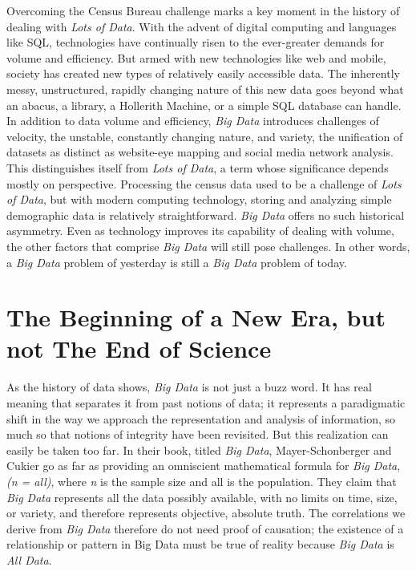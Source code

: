 \documentclass[sigconf]{acmart}
\begin{document}
	Overcoming the Census Bureau challenge marks a key moment in the history of dealing with {\em Lots of Data}. With the advent of digital computing and languages like SQL, technologies have continually risen to the ever-greater demands for volume and efficiency.\cite{Rand} But armed with new technologies like web and mobile, society has created new types of relatively easily accessible data.\cite{Data_History} The inherently messy, unstructured, rapidly changing nature of this new data goes beyond what an abacus, a library, a Hollerith Machine, or a simple SQL database can handle. In addition to data volume and efficiency, {\em Big Data} introduces challenges of velocity, the unstable, constantly changing nature, and variety, the unification of datasets as distinct as website-eye mapping and social media network analysis.\cite{3Vs} This distinguishes itself from {\em Lots of Data}, a term whose significance depends mostly on perspective. Processing the census data used to be a challenge of {\em Lots of Data}, but with modern computing technology, storing and analyzing simple demographic data is relatively straightforward. {\em Big Data} offers no such historical asymmetry. Even as technology improves its capability of dealing with volume, the other factors that comprise {\em Big Data} will still pose challenges. In other words, a {\em Big Data} problem of yesterday is still a {\em Big Data} problem of today.

\section{The Beginning of a New Era, but not The End of Science}
As the history of data shows, {\em Big Data} is not just a buzz word. It has real meaning that separates it from past notions of data; it represents a paradigmatic shift in the way we approach the representation and analysis of information, so much so that notions of integrity have been revisited. But this realization can easily be taken too far. In their book, titled {\em Big Data}, Mayer-Schonberger and Cukier go as far as providing an omniscient mathematical formula for {\em Big Data}, {\em (n = all)}, where {\em n} is the sample size and all is the population.  They claim that {\em Big Data} represents all the data possibly available, with no limits on time, size, or variety, and therefore represents objective, absolute truth. The correlations we derive from {\em Big Data} therefore do not need proof of causation; the existence of a relationship or pattern in Big Data must be true of reality because {\em Big Data} is {\em All Data}.\cite{Keystone}
\end{document}
